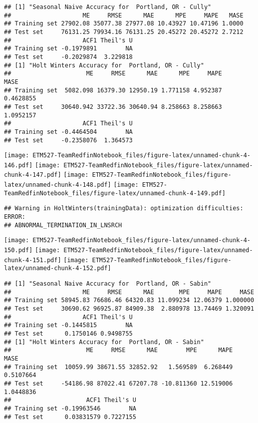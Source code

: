 \documentclass[]{article}
\begin{document}
\begin{verbatim}
## [1] "Seasonal Naive Accuracy for  Portland, OR - Cully"
##                    ME     RMSE      MAE      MPE     MAPE   MASE
## Training set 27902.08 35077.38 27977.08 10.43927 10.47196 1.0000
## Test set     76131.25 79934.16 76131.25 20.45272 20.45272 2.7212
##                    ACF1 Theil's U
## Training set -0.1979891        NA
## Test set     -0.2029874  3.229818
## [1] "Holt Winters Accuracy for  Portland, OR - Cully"
##                     ME     RMSE      MAE      MPE     MAPE      MASE
## Training set  5082.098 16379.30 12950.19 1.771158 4.952387 0.4628855
## Test set     30640.942 33722.36 30640.94 8.258663 8.258663 1.0952157
##                    ACF1 Theil's U
## Training set -0.4464504        NA
## Test set     -0.2358076  1.364573
\end{verbatim}

\texttt{[image: ETM527-TeamRedfinNotebook\_files/figure-latex/unnamed-chunk-4-146.pdf]}
\texttt{[image: ETM527-TeamRedfinNotebook\_files/figure-latex/unnamed-chunk-4-147.pdf]}
\texttt{[image: ETM527-TeamRedfinNotebook\_files/figure-latex/unnamed-chunk-4-148.pdf]}
\texttt{[image: ETM527-TeamRedfinNotebook\_files/figure-latex/unnamed-chunk-4-149.pdf]}

\begin{verbatim}
## Warning in HoltWinters(trainingData): optimization difficulties: ERROR:
## ABNORMAL_TERMINATION_IN_LNSRCH
\end{verbatim}

\texttt{[image: ETM527-TeamRedfinNotebook\_files/figure-latex/unnamed-chunk-4-150.pdf]}
\texttt{[image: ETM527-TeamRedfinNotebook\_files/figure-latex/unnamed-chunk-4-151.pdf]}
\texttt{[image: ETM527-TeamRedfinNotebook\_files/figure-latex/unnamed-chunk-4-152.pdf]}

\begin{verbatim}
## [1] "Seasonal Naive Accuracy for  Portland, OR - Sabin"
##                    ME     RMSE      MAE       MPE     MAPE     MASE
## Training set 58945.83 76686.46 64320.83 11.099234 12.06379 1.000000
## Test set     30690.62 96925.87 84909.38  2.880978 13.74469 1.320091
##                    ACF1 Theil's U
## Training set -0.1445815        NA
## Test set      0.1750146 0.9498755
## [1] "Holt Winters Accuracy for  Portland, OR - Sabin"
##                     ME     RMSE      MAE        MPE      MAPE      MASE
## Training set  10059.99 38671.55 32852.92   1.569589  6.268449 0.5107664
## Test set     -54186.98 87022.41 67207.78 -10.811360 12.519006 1.0448836
##                     ACF1 Theil's U
## Training set -0.19963546        NA
## Test set      0.03831579 0.7227155
\end{verbatim}
\end{document}
